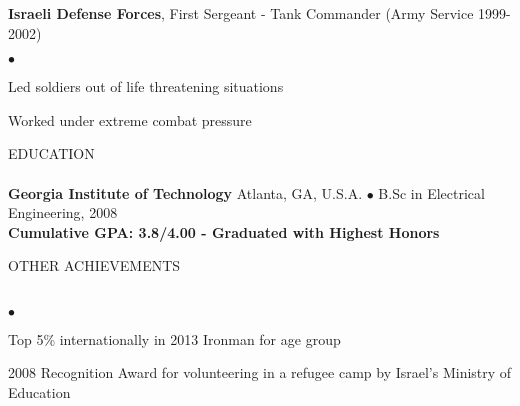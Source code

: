 \documentclass[12pt]{article}
\newcommand{\lineunder}{\vspace*{-9pt} \\ \hspace*{-18pt} \hrulefill \\}
\newcommand{\header}[1]{{\hspace*{-15pt}\vspace*{6pt} \textsc{#1}} \vspace*{-9pt} \lineunder}
\newcommand{\employer}[2]{{ #1 (#2) }}
\newenvironment{achievements}{\begin{list}{$\bullet$}{\topsep 0pt \itemsep -2pt}}{\vspace*{4pt}\end{list}}
\newcommand{\schoolwithcourses}[4]{
 \textbf{#1} #2 $\bullet$ #3\\
#4 \\
\vspace*{5pt}
}
\begin{document}
  \employer{\textbf{Israeli Defense Forces}, First Sergeant - Tank Commander}{Army Service 1999-2002}
  	\begin{achievements}
      \item Led soldiers out of life threatening situations
    	\item Worked under extreme combat pressure
  	\end{achievements}

\header{EDUCATION}
  \schoolwithcourses{Georgia Institute of Technology}{Atlanta, GA, U.S.A.}{B.Sc in Electrical Engineering, 2008}
    {\textbf{Cumulative GPA: 3.8/4.00  - Graduated with Highest Honors}}

\header{OTHER ACHIEVEMENTS}
  \begin{achievements}
    \item Top 5\% internationally in 2013 Ironman for age group
    \item 2008 Recognition Award for volunteering in a refugee camp by Israel’s Ministry of Education
  \end{achievements}
\end{document}
